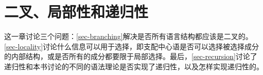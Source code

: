 
\chapter{二叉、局部性和递归性}

这一章讨论三个问题：\ref{sec-branching}解决是否所有语言结构都应该是二叉的。\ref{sec-locality}讨论什么信息可以用于选择，即支配中心语是否可以选择被选择成分的内部结构，或是否所有的成分都要限于局部选择。最后，\ref{sec-recursion}讨论了递归性和本书讨论的不同的语法理论是否实现了递归性，以及怎样实现递归性的。




